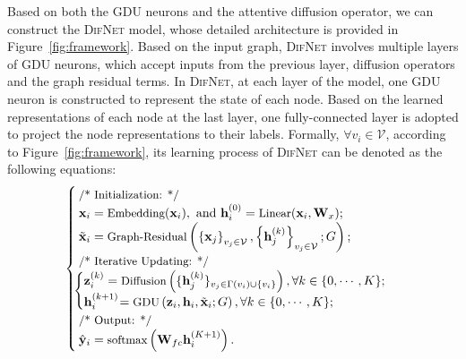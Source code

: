 \documentclass{article}
\newcommand{\mb}{\mathbf}
\newcommand{\mc}{\mathcal}
\newcommand{\our}{\textsc{DifNet}}
\newcommand{\gdu}{\textsc{GDU}}
\begin{document}
Based on both the {\gdu} neurons and the attentive diffusion operator, we can construct the {\our} model, whose detailed architecture is provided in Figure~\ref{fig:framework}. Based on the input graph, {\our} involves multiple layers of {\gdu} neurons, which accept inputs from the previous layer, diffusion operators and the graph residual terms. In {\our}, at each layer of the model, one {\gdu} neuron is constructed to represent the state of each node. Based on the learned representations of each node at the last layer, one fully-connected layer is adopted to project the node representations to their labels. Formally, $\forall v_i \in \mc{V}$, according to Figure~\ref{fig:framework}, its learning process of {\our} can be denoted as the following equations:\begingroup\makeatletter\def\f@size{8.0}\check@mathfonts
\begin{equation}
\hspace{-10pt}\begin{cases}
&\hspace{-8pt}{\small \mbox{/* Initialization: */}}\\
&\hspace{-8pt}\mb{x}_i = \mbox{\small Embedding}(\mb{x}_i), \mbox{ and } \mb{h}_i^{(0)} = \mbox{\small Linear}(\mb{x}_i, \mb{W}_x); \\
&\hspace{-8pt}\tilde{\mb{x}}_i = \mbox{\small Graph-Residual}\left(\left\{\mb{x}_j \right\}_{v_j \in \mc{V}}, \left\{\mb{h}_j^{(k)} \right\}_{v_j \in \mc{V}}; G \right); \\
&\hspace{-8pt}{\small \mbox{/* Iterative Updating: */}}\\
&\hspace{-12pt}\begin{cases}
&\hspace{-10pt} \mb{z}_i^{(k)} = \mbox{\small Diffusion} \left(\{\mb{h}_j^{(k)}\}_{v_j \in \Gamma(v_i) \cup \{v_i\}} \right), \forall k \in \{0, \cdots, K\}; \\
&\hspace{-10pt} \mb{h}_i^{(k+1)} \hspace{-2pt} = \mbox{\small GDU}\left( \mb{z}_i, \mb{h}_i, \tilde{\mb{x}}_i; G \right), \forall k \in \{0, \cdots, K\};\\
\end{cases}\\
&\hspace{-8pt}{\small \mbox{/* Output: */}}\\
&\hspace{-8pt}\hat{\mb{y}}_i = \mbox{\small softmax} \left(\mb{W}_{fc} \mb{h}_i^{(K+1)} \right).
\end{cases}
\end{equation}\endgroup
\end{document}
